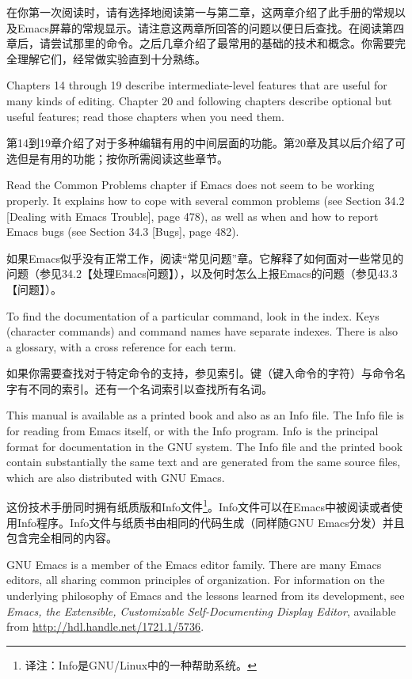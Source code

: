 在你第一次阅读时，请有选择地阅读第一与第二章，这两章介绍了此手册的常规以及Emacs屏幕的常规显示。请注意这两章所回答的问题以便日后查找。在阅读第四章后，请尝试那里的命令。之后几章介绍了最常用的基础的技术和概念。你需要完全理解它们，经常做实验直到十分熟练。\par
Chapters 14 through 19 describe intermediate-level features that are useful for many kinds of editing. Chapter 20 and following chapters describe optional but useful features; read those chapters when you need them.\par
第14到19章介绍了对于多种编辑有用的中间层面的功能。第20章及其以后介绍了可选但是有用的功能；按你所需阅读这些章节。\par
Read the Common Problems chapter if Emacs does not seem to be working properly. It explains how to cope with several common problems (see Section 34.2 [Dealing with Emacs Trouble], page 478), as well as when and how to report Emacs bugs (see Section 34.3 [Bugs], page 482).\par
如果Emacs似乎没有正常工作，阅读“常见问题”章。它解释了如何面对一些常见的问题（参见34.2【处理Emacs问题】），以及何时怎么上报Emacs的问题（参见43.3【问题】）。\par
To find the documentation of a particular command, look in the index. Keys (character commands) and command names have separate indexes. There is also a glossary, with a cross reference for each term.\par
如果你需要查找对于特定命令的支持，参见索引。键（键入命令的字符）与命令名字有不同的索引。还有一个名词索引以查找所有名词。\par
This manual is available as a printed book and also as an Info file. The Info file is for reading from Emacs itself, or with the Info program. Info is the principal format for documentation in the GNU system. The Info file and the printed book contain substantially the same text and are generated from the same source files, which are also distributed with GNU Emacs.\par
这份技术手册同时拥有纸质版和Info文件\footnote{译注：Info是GNU/Linux中的一种帮助系统。}。Info文件可以在Emacs中被阅读或者使用Info程序。Info文件与纸质书由相同的代码生成（同样随GNU Emacs分发）并且包含完全相同的内容。\par
GNU Emacs is a member of the Emacs editor family. There are many Emacs editors, all sharing common principles of organization. For information on the underlying philosophy of Emacs and the lessons learned from its development, see \textit{Emacs, the Extensible, Customizable Self-Documenting Display Editor}, available from \url{http://hdl.handle.net/1721.1/5736}.\par

